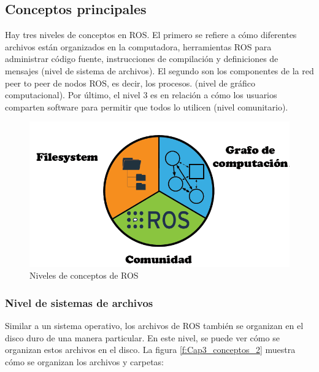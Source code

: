     \newpage
    
    \subsection{Conceptos principales}
            
            Hay tres niveles de conceptos en ROS. El primero se refiere a cómo diferentes archivos están organizados en la computadora, herramientas ROS para administrar código fuente, instrucciones de compilación y definiciones de mensajes (nivel de sistema de archivos). El segundo son los componentes de la red peer to peer de nodos ROS, es decir, los procesos. (nivel de gráfico computacional). Por último, el nivel 3 es en relación a cómo los usuarios comparten software para permitir que todos lo utilicen (nivel comunitario).
            
            \begin{figure}[htb]
                \centering
                \includegraphics[width=1\linewidth]{Main/Chapter3/Images3/nivel_s_a_1.png}
                \caption{Niveles de conceptos de ROS}
                \label{f:Cap3_conceptos_1}
            \end{figure} 
            

                
                
               \newpage
               
            \subsubsection{Nivel de sistemas de archivos}

                Similar a un sistema operativo, los archivos de ROS también se organizan en el disco duro de una manera particular. En este nivel, se puede ver cómo se organizan estos archivos en el disco. La figura \ref{f:Cap3_conceptos_2} muestra cómo se organizan los archivos y carpetas:
                
